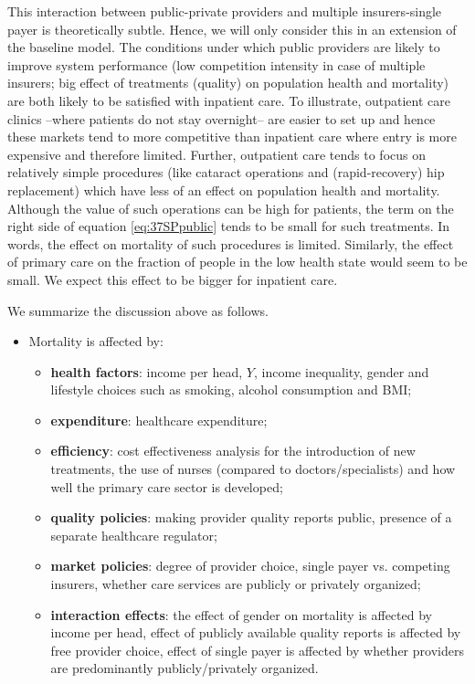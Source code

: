 \documentclass[a4paper,12pt]{article}
\begin{document}
This interaction between public-private providers and multiple insurers-single payer is theoretically subtle. Hence, we will only consider this in an extension of the baseline model. The conditions under which public providers are likely to improve system performance (low competition intensity in case of multiple insurers; big effect of treatments (quality) on population health and mortality) are both likely to be satisfied with inpatient care. To illustrate, outpatient care clinics --where patients do not stay overnight-- are easier to set up and hence these markets tend to more competitive than inpatient care where entry is more expensive and therefore limited. Further, outpatient care tends to focus on relatively simple procedures (like cataract operations and (rapid-recovery) hip replacement) which have less of an effect on population health and mortality. Although the value of such operations can be high for patients, the term on the right side of equation \eqref{eq:37SPpublic} tends to be small for such treatments. In words, the effect on mortality of such procedures is limited. Similarly, the effect of primary care on the fraction of people in the low health state would seem to be small. We expect this effect to be bigger for inpatient care.

We summarize the discussion above as follows.

\begin{itemize}
\item Mortality is affected by:
\begin{itemize}
\item \textbf{health factors}:  income per head, \(Y\), income inequality, gender and lifestyle choices such as smoking, alcohol consumption and BMI;
\item \textbf{expenditure}: healthcare expenditure;
\item \textbf{efficiency}: cost effectiveness analysis for the introduction of new treatments, the use of nurses (compared to doctors/specialists) and how well the primary care sector is developed;
\item \textbf{quality policies}: making provider quality reports public, presence of a separate healthcare regulator;
\item \textbf{market policies}: degree of provider choice, single payer vs. competing insurers, whether care services are publicly or privately organized;
\item \textbf{interaction effects}: the effect of gender on mortality is affected by income per head, effect of publicly available quality reports is affected by free provider choice, effect of single payer is affected by whether providers are predominantly publicly/privately organized.
\end{itemize}
\end{itemize}
\end{document}
